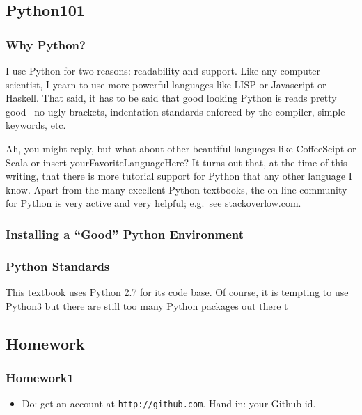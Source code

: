 \subsection{Python101}\label{python101}

\subsubsection{Why Python?}\label{why-python}

I use Python for two reasons: readability and support. Like any computer
scientist, I yearn to use more powerful languages like LISP or
Javascript or Haskell. That said, it has to be said that good looking
Python is reads pretty good-- no ugly brackets, indentation standards
enforced by the compiler, simple keywords, etc.

Ah, you might reply, but what about other beautiful languages like
CoffeeScipt or Scala or insert yourFavoriteLanguageHere? It turns out
that, at the time of this writing, that there is more tutorial support
for Python that any other language I know. Apart from the many excellent
Python textbooks, the on-line community for Python is very active and
very helpful; e.g.~see stackoverlow.com.

\subsubsection{Installing a ``Good'' Python
Environment}\label{installing-a-good-python-environment}

\subsubsection{Python Standards}\label{python-standards}

This textbook uses Python 2.7 for its code base. Of course, it is
tempting to use Python3 but there are still too many Python packages out
there t

\subsection{Homework}\label{homework}

\subsubsection{Homework1}\label{homework1}

\begin{itemize}
\itemsep1pt\parskip0pt
\item
  Do: get an account at \texttt{http://github.com}. Hand-in: your Github
  id.
\end{itemize}
